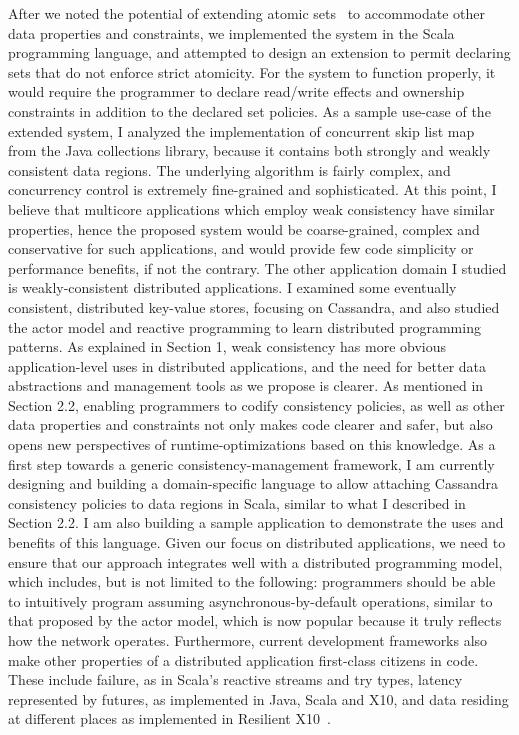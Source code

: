\documentclass[]{usiinfprospectus}
\begin{document}

After we noted the potential of extending atomic sets~\cite{dolby2012data} to accommodate other data properties and constraints, we implemented the system  in the Scala programming language, and attempted to design an extension to permit declaring sets that do not enforce strict atomicity. For the system to function properly, it would require the programmer to declare read/write effects and ownership constraints in addition to the declared set policies. As a sample use-case of the extended system, I analyzed the implementation of concurrent skip list map~\cite{concurrentskiplistmap} from the Java collections library, because it contains both strongly and weakly consistent data regions. The underlying algorithm is fairly complex, and concurrency control is extremely fine-grained and sophisticated. At this point, I believe that multicore applications which employ weak consistency have similar properties, hence the proposed system would be coarse-grained, complex and conservative for such applications, and would provide few code simplicity or performance benefits, if not the contrary. The other application domain I studied is weakly-consistent distributed applications. I examined some eventually consistent, distributed key-value stores, focusing on Cassandra, and also studied the actor model and reactive programming to learn distributed programming patterns. As explained in Section 1, weak consistency has more obvious application-level uses in distributed applications, and the need for better data abstractions and management tools as we propose is clearer. As mentioned in Section 2.2, enabling programmers to codify consistency policies, as well as other data properties and constraints not only makes code clearer and safer, but also opens new perspectives of runtime-optimizations based on this knowledge. As a first step towards a generic consistency-management framework, I am currently designing and building a domain-specific language to allow attaching Cassandra consistency policies to data regions in Scala, similar to what I described in Section 2.2. I am also building a sample application to demonstrate the uses and benefits of this language. 
Given our focus on distributed applications, we need to ensure that our approach integrates well with a distributed programming model, which includes, but is not limited to the following: programmers should be able to intuitively program assuming asynchronous-by-default operations, similar to that proposed by the actor model, which is now popular because it truly reflects how the network operates. Furthermore, current development frameworks also make other properties of a distributed application first-class citizens in code. These include failure, as in Scala's reactive streams and try types, latency represented by futures, as implemented in Java, Scala and X10, and data residing at different places as implemented in Resilient X10~\cite{cunningham2014resilient}. 
\end{document}
